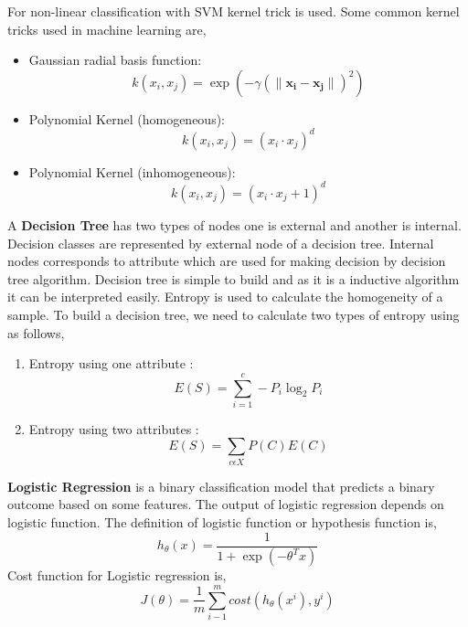For non-linear classification with SVM kernel trick is used. Some common kernel tricks used in machine learning are,
\begin{itemize}
    \item Gaussian radial basis function:
    \begin{equation}
         k(x_{i}, x_{j}) = \exp{(-\gamma(\lVert \mathbf{x_{i}-x_{j}} \rVert)^2)}
    \end{equation}
    \item Polynomial Kernel (homogeneous):
    \begin{equation}
        k(x_{i}, x_{j}) = (x_{i}\cdot x_{j})^d
    \end{equation}
     \item Polynomial Kernel (inhomogeneous):
     \begin{equation}
         k(x_{i}, x_{j}) = (x_{i}\cdot x_{j}+1)^d
     \end{equation}
\end{itemize}
\vspace{0.1cm}

A \textbf{Decision Tree}\cite{chavan2014survey} has two types of nodes one is external and another is internal. Decision classes are represented by external node of a decision tree. Internal nodes corresponds to attribute which are used for making decision by decision tree algorithm. Decision tree is simple to build and as it is a inductive algorithm it can be interpreted easily. Entropy is used to calculate the homogeneity of a sample. To build a decision tree, we need to calculate two types of entropy using as follows,
\begin{enumerate}
    \item Entropy using one attribute :
    \begin{equation}
         E(S) = \sum_{i=1}^{c}-P_i \log_2P_i
    \end{equation}
    \item Entropy using two attributes :
    \begin{equation}
        E(S) = \sum_{c\epsilon X}{}P(C)E(C) 
    \end{equation}
    
\end{enumerate}


\textbf{Logistic Regression}\cite{sharma2015active} is a binary classification model that predicts a binary outcome based on some features. The output of logistic regression depends on logistic function. The definition of logistic function or hypothesis function is,
\begin{equation}
    h_{\theta}(x) =  \frac{1}{1+\exp({-\theta^T x})}
\end{equation}
Cost function for Logistic regression is,
\begin{equation}
    J(\theta) = \frac{1}{m}\sum_{i-1}^{m}cost(h_{\theta}(x^{i}),y^{i})   
\end{equation}

